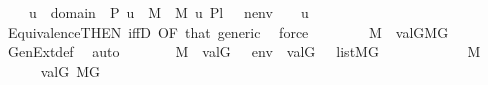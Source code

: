 \begin{isabellebody}
\ \ \ \ {\isachardoublequoteopen}u\ {\isasymin}\ domain{\isacharparenleft}{\kern0pt}{\isasympi}{\isacharparenright}{\kern0pt}\ {\isasymtimes}\ P{\isachardoublequoteclose}\ {\isachardoublequoteopen}u\ {\isasymin}\ M{\isachardoublequoteclose}\ \ {\isachardoublequoteopen}M{\isacharcomma}{\kern0pt}\ {\isacharbrackleft}{\kern0pt}u{\isacharbrackright}{\kern0pt}{\isacharat}{\kern0pt}\ {\isacharquery}{\kern0pt}Pl{}\ {\isacharat}{\kern0pt}{\isacharbrackleft}{\kern0pt}{\isasympi}{\isacharbrackright}{\kern0pt}\ {\isacharat}{\kern0pt}\ nenv\ {\isasymTurnstile}\ {\isacharquery}{\kern0pt}{\isasympsi}{\isachardoublequoteclose}\ \ u\isanewline
\ \ \ \ \isamarkupfalse%
\ Equivalence{\isacharbrackleft}{\kern0pt}THEN\ iffD{}{\isacharcomma}{\kern0pt}\ OF\ that{\isacharbrackright}{\kern0pt}\ generic\ \isamarkupfalse%
\ force\isanewline
\ \ \isamarkupfalse%
\ \isanewline
\ \ \isamarkupfalse%
\ {\isachardoublequoteopen}{\isasymtheta}{\isasymin}M\ {\isasymLongrightarrow}\ val{\isacharparenleft}{\kern0pt}G{\isacharcomma}{\kern0pt}{\isasymtheta}{\isacharparenright}{\kern0pt}{\isasymin}M{\isacharbrackleft}{\kern0pt}G{\isacharbrackright}{\kern0pt}{\isachardoublequoteclose}\ \ {\isasymtheta}\isanewline
\ \ \ \ \isamarkupfalse%
\ GenExt{\isacharunderscore}{\kern0pt}def\ \isamarkupfalse%
\ auto\isanewline
\ \ \isamarkupfalse%
\isanewline
\ \ \isamarkupfalse%
\ {\isachardoublequoteopen}{\isasymtheta}{\isasymin}\ M\ {\isasymLongrightarrow}\ {\isacharbrackleft}{\kern0pt}val{\isacharparenleft}{\kern0pt}G{\isacharcomma}{\kern0pt}\ {\isasymtheta}{\isacharparenright}{\kern0pt}{\isacharbrackright}{\kern0pt}\ {\isacharat}{\kern0pt}\ env\ {\isacharat}{\kern0pt}\ {\isacharbrackleft}{\kern0pt}val{\isacharparenleft}{\kern0pt}G{\isacharcomma}{\kern0pt}\ {\isasympi}{\isacharparenright}{\kern0pt}{\isacharbrackright}{\kern0pt}\ {\isasymin}\ list{\isacharparenleft}{\kern0pt}M{\isacharbrackleft}{\kern0pt}G{\isacharbrackright}{\kern0pt}{\isacharparenright}{\kern0pt}{\isachardoublequoteclose}\ \ {\isasymtheta}\isanewline
\ \ \isamarkupfalse%
\ {\isacharminus}{\kern0pt}\isanewline
\ \ \ \ \isamarkupfalse%
\ {\isacartoucheopen}{\isasympi}{\isasymin}M{\isacartoucheclose}\isanewline
\ \ \ \ \isamarkupfalse%
\ {\isachardoublequoteopen}val{\isacharparenleft}{\kern0pt}G{\isacharcomma}{\kern0pt}{\isasympi}{\isacharparenright}{\kern0pt}{\isasymin}\ M{\isacharbrackleft}{\kern0pt}G{\isacharbrackright}{\kern0pt}{\isachardoublequoteclose}\ \isamarkupfalse%

\end{isabellebody}
